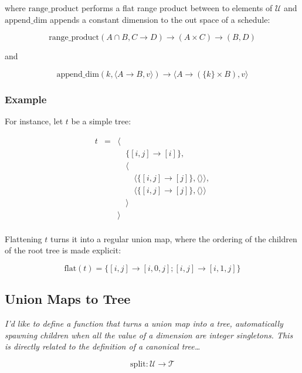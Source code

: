 \documentclass{article}
\begin{document}
\noindent where $\mathrm{range\_product}$ performs a flat range product between to elements of $\mathcal{U}$ and $\mathrm{append\_dim}$ appends a constant dimension to the out space of a schedule:

\[
    \mathrm{range\_product}(A \cap B, C \rightarrow D) \rightarrow (A \times C) \rightarrow (B, D)
\]

\noindent and

\[
    \mathrm{append\_dim}(k, \langle A \rightarrow B, v\rangle) \rightarrow \langle A \rightarrow (\{k\} \times B), v \rangle
\]

\subsubsection*{Example}

For instance, let $t$ be a simple tree:

\[
    \begin{array}{lcl}
        t &=& \langle \\
          & & \quad\{[i,j] \rightarrow [i] \},\\
          & & \quad\langle \\
          & & \quad\quad \langle\{ [i,j] \rightarrow [j] \}, \langle\rangle\rangle,\\
          & & \quad\quad \langle\{ [i,j] \rightarrow [j] \}, \langle\rangle\rangle\\
          & & \quad\rangle \\
          & & \rangle \\
    \end{array}
\]

Flattening $t$ turns it into a regular union map, where the ordering of the children of the root tree is made explicit:

\[
    \mathrm{flat}(t) = \{ [i,j] \rightarrow [i,0,j] ; [i,j] \rightarrow [i,1,j] \}
\]

\subsection{Union Maps to Tree}

{ \raggedleft\emph{I'd like to define a function that turns a union map into a
tree, automatically spawning children when all the value of a dimension are
integer singletons. This is directly related to the definition of a canonical tree\dots} }

\[
    \mathrm{split}: \mathcal{U} \rightarrow \mathcal{T}
\]
\end{document}
